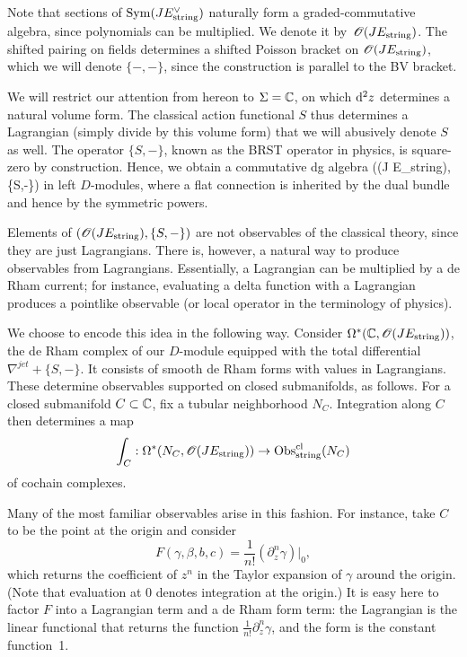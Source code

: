 Note that sections of ${\rm Sym}(J E_{\rm string}^\vee)$ naturally form a graded-commutative algebra, 
since polynomials can be multiplied.
We denote it by~$\mathscr O(J E_{\rm string})$.
The shifted pairing on fields determines a shifted Poisson bracket on $\mathscr O(J E_{\rm string})$,
which we will denote $\{-,-\}$,
since the construction is parallel to the BV bracket.

We will restrict our attention from hereon to $\Sigma = \mathbb C$,
on which ${\rm d}^2 z$ determines a natural volume form.
The classical action functional $S$ thus determines a Lagrangian (simply divide by this volume form) that we will abusively denote $S$ as well.
The operator $\{S,-\}$, known as the BRST operator in physics, is square-zero by construction.
Hence, we obtain a commutative dg algebra 
\ben
\left(\sO(J E_{\rm string}), \{S,-\}\right)
\een
in left $D$-modules,
where a flat connection is inherited by the dual bundle and hence by the symmetric powers.

Elements of $\left(\mathscr O(J E_{\rm string}), \{S,-\}\right)$ are not observables of the classical theory,
since they are just Lagrangians.
There is, however, a natural way to produce observables from Lagrangians.
Essentially, a Lagrangian can be multiplied by a de Rham current;
for instance, evaluating a delta function with a Lagrangian produces a pointlike observable
(or local operator in the terminology of physics).

We choose to encode this idea in the following way.
Consider $\Omega^*(\mathbb C , \mathscr O(J E_{\rm string}))$,
the de Rham complex of our $D$-module 
equipped with the total differential $\nabla^{jet} + \{S, -\}$. 
It consists of smooth de Rham forms with values in Lagrangians.
These determine observables supported on closed submanifolds, as follows.
For a closed submanifold $C \subset \mathbb C$, 
fix a tubular neighborhood $N_C$.
Integration along $C$ then determines a map 
\begin{equation}
\label{eqn: int over C}
\int_C : \Omega^*(N_C , \mathscr O(J E_{\rm string})) \to {\rm Obs}^{{\rm cl}}_{\rm string}(N_C) 
\end{equation}
of cochain complexes.

Many of the most familiar observables arise in this fashion.
For instance, take $C$ to be the point at the origin and consider
\[
F(\gamma,\beta,b,c) = \frac{1}{n!}(\partial_z^n \gamma)\big|_{0},
\]
which returns the coefficient of $z^n$ in the Taylor expansion of $\gamma$ around the origin.
(Note that evaluation at $0$ denotes integration at the origin.)
It is easy here to factor $F$ into a Lagrangian term and a de Rham form term: 
the Lagrangian is the linear functional that returns the function $\frac{1}{n!}\partial_z^n \gamma$, 
and the form is the constant function~1.

